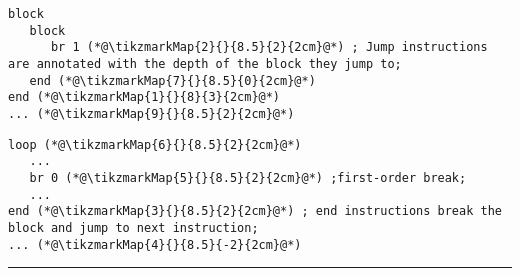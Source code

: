 
\begin{minipage}{0.95\linewidth}
   
   \begin{minipage}{0.45\linewidth}

   \begin{lstlisting}    
block
   block
      br 1 (*@\tikzmarkMap{2}{}{8.5}{2}{2cm}@*) ; Jump instructions are annotated with the depth of the block they jump to; 
   end (*@\tikzmarkMap{7}{}{8.5}{0}{2cm}@*)
end (*@\tikzmarkMap{1}{}{8}{3}{2cm}@*)
... (*@\tikzmarkMap{9}{}{8.5}{2}{2cm}@*)
   \end{lstlisting}
   \end{minipage}\hspace{1mm}
   \begin{minipage}{0.44\linewidth}

   \begin{lstlisting}    
loop (*@\tikzmarkMap{6}{}{8.5}{2}{2cm}@*)
   ...
   br 0 (*@\tikzmarkMap{5}{}{8.5}{2}{2cm}@*) ;first-order break;
   ... 
end (*@\tikzmarkMap{3}{}{8.5}{2}{2cm}@*) ; end instructions break the block and jump to next instruction; 
... (*@\tikzmarkMap{4}{}{8.5}{-2}{2cm}@*)
   \end{lstlisting}
   \end{minipage}
      \centering
      \hrule
      \vspace{2mm}
      \label{background:wasm:block}
\end{minipage}
